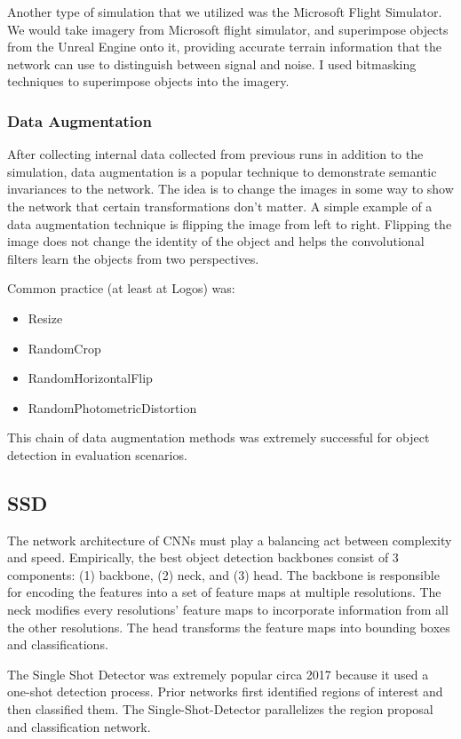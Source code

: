 \documentclass[12pt]{article}
\begin{document}
Another type of simulation that we utilized was the Microsoft Flight Simulator. We would take imagery from Microsoft flight simulator, and superimpose objects from the Unreal Engine onto it, providing accurate terrain information that the network can use to distinguish between signal and noise. I used bitmasking techniques to superimpose objects into the imagery.

\subsubsection{Data Augmentation}
After collecting internal data collected from previous runs in addition to the simulation, data augmentation is a popular technique to demonstrate semantic invariances to the network. \cite{krizhevskyImageNetClassificationDeep2012} The idea is to change the images in some way to show the network that certain transformations don't matter. A simple example of a data augmentation technique is flipping the image from left to right. Flipping the image does not change the identity of the object and helps the convolutional filters learn the objects from two perspectives.

Common practice (at least at Logos) was:
\begin{itemize}
    \item Resize
    \item RandomCrop
    \item RandomHorizontalFlip
    \item RandomPhotometricDistortion
\end{itemize}
This chain of data augmentation methods was extremely successful for object detection in evaluation scenarios.

\subsection{SSD}
The network architecture of CNNs must play a balancing act between complexity and speed. Empirically, the best object detection backbones consist of 3 components: (1) backbone, (2) neck, and (3) head.
The backbone is responsible for encoding the features into a set of feature maps at multiple resolutions. The neck modifies every resolutions' feature maps to incorporate information from all the other resolutions. \cite{linFeaturePyramidNetworks2017} The head transforms the feature maps into bounding boxes and classifications.

The Single Shot Detector was extremely popular circa 2017 because it used a one-shot detection process. \cite{liuSSDSingleShot2016} Prior networks first identified regions of interest and then classified them. The Single-Shot-Detector parallelizes the region proposal and classification network. 
\end{document}
